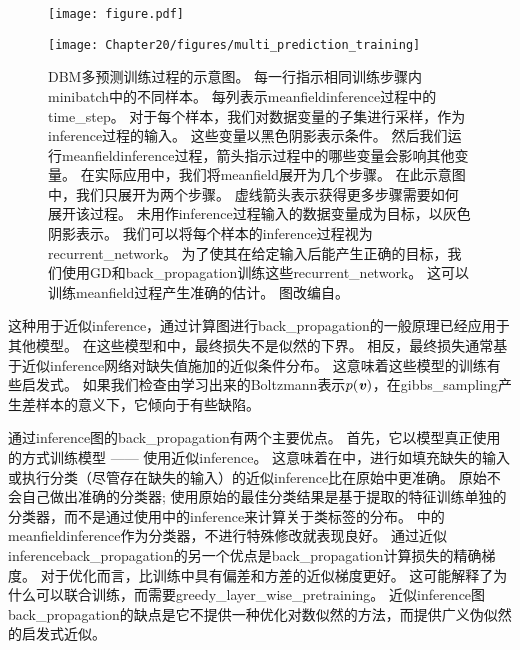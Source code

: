 \begin{figure}[!htb]
\ifOpenSource
\centerline{\texttt{[image: figure.pdf]}}
\else
\centerline{\texttt{[image: Chapter20/figures/multi\_prediction\_training]}}
\fi
\caption{\gls{DBM}多预测训练过程的示意图。
每一行指示相同训练步骤内\gls{minibatch}中的不同样本。
每列表示\gls{meanfield}\gls{inference}过程中的\gls{time_step}。
对于每个样本，我们对数据变量的子集进行采样，作为\gls{inference}过程的输入。
这些变量以黑色阴影表示条件。
然后我们运行\gls{meanfield}\gls{inference}过程，箭头指示过程中的哪些变量会影响其他变量。
在实际应用中，我们将\gls{meanfield}展开为几个步骤。
在此示意图中，我们只展开为两个步骤。
虚线箭头表示获得更多步骤需要如何展开该过程。
未用作\gls{inference}过程输入的数据变量成为目标，以灰色阴影表示。
我们可以将每个样本的\gls{inference}过程视为\gls{recurrent_network}。
为了使其在给定输入后能产生正确的目标，我们使用\gls{GD}和\gls{back_propagation}训练这些\gls{recurrent_network}。
这可以训练\gls{meanfield}过程产生准确的估计。
图改编自\citet{Goodfellow-et-al-NIPS2013}。
}
\label{fig:chap20_multi_prediction_training}
\end{figure}

这种用于近似\gls{inference}，通过计算图进行\gls{back_propagation}的一般原理已经应用于其他模型\citep{Stoyanov2011,brakel13a}。
在这些模型和中，最终损失不是似然的下界。
相反，最终损失通常基于近似\gls{inference}网络对缺失值施加的近似条件分布。
这意味着这些模型的训练有些启发式。
如果我们检查由学习出来的\gls{Boltzmann}表示$p(\boldsymbol{\mathit{v}})$，在\gls{gibbs_sampling}产生差样本的意义下，它倾向于有些缺陷。

通过\gls{inference}图的\gls{back_propagation}有两个主要优点。
首先，它以模型真正使用的方式训练模型 —— 使用近似\gls{inference}。
这意味着在中，进行如填充缺失的输入或执行分类（尽管存在缺失的输入）的近似\gls{inference}比在原始中更准确。
原始不会自己做出准确的分类器; 使用原始的最佳分类结果是基于提取的特征训练单独的分类器，而不是通过使用中的\gls{inference}来计算关于类标签的分布。
中的\gls{meanfield}\gls{inference}作为分类器，不进行特殊修改就表现良好。
通过近似\gls{inference}\gls{back_propagation}的另一个优点是\gls{back_propagation}计算损失的精确梯度。
对于优化而言，比训练中具有偏差和方差的近似梯度更好。
这可能解释了为什么可以联合训练，而需要\gls{greedy_layer_wise_pretraining}。
近似\gls{inference}图\gls{back_propagation}的缺点是它不提供一种优化对数似然的方法，而提供广义伪似然的启发式近似。

